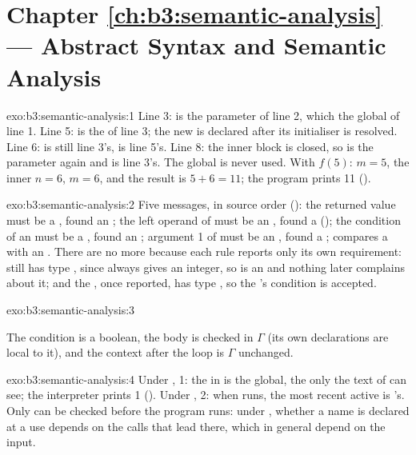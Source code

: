 \section*{Chapter \ref{ch:b3:semantic-analysis} --- Abstract Syntax and Semantic Analysis}

\begin{solution}{exo:b3:semantic-analysis:1}
Line 3:  is the parameter of line 2, which  the global of line 1. Line 5:  is the  of line 3; the new  is declared after its initialiser is resolved. Line 6:  is still line 3's,  is line 5's. Line 8: the inner block is closed, so  is the parameter again and  is line 3's. The global  is never used. With $f(5)$: $m = 5$, the inner $n = 6$, $m = 6$, and the result is $5 + 6 = 11$; the program prints 11 ().
\end{solution}

\begin{solution}{exo:b3:semantic-analysis:2}
Five messages, in source order (): the returned value must be a , found an ; the left operand of  must be an , found a  (); the condition of an  must be a , found an ; argument 1 of  must be an , found a ;  compares a  with an . There are no more because each rule reports only its own requirement:  still has type , since \code{+} always gives an integer, so  is an  and nothing later complains about it; and the \code{==}, once reported, has type , so the 's condition is accepted.
\end{solution}

\begin{solution}{exo:b3:semantic-analysis:3}
\begin{mathpar}
\end{mathpar}
The condition is a boolean, the body is checked in $\Gamma$ (its own declarations are local to it), and the context after the loop is $\Gamma$ unchanged.
\end{solution}

\begin{solution}{exo:b3:semantic-analysis:4}
Under , 1: the  in  is the global, the only  the text of  can see; the interpreter prints 1 (). Under , 2: when  runs, the most recent active  is 's. Only  can be checked before the program runs: under , whether a name is declared at a use depends on the calls that lead there, which in general depend on the input.
\end{solution}

